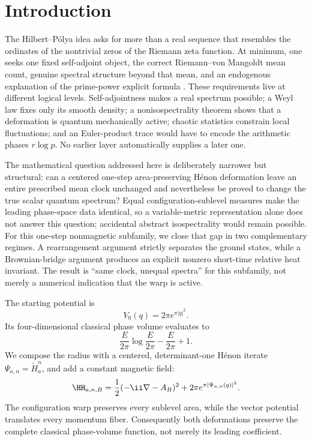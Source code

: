 \section{Introduction}
\label{sec:introduction}

The Hilbert--P\'olya idea asks for more than a real sequence that resembles
the ordinates of the nontrivial zeros of the Riemann zeta function.  At
minimum, one seeks one fixed self-adjoint object, the correct
Riemann--von Mangoldt mean count, genuine spectral structure beyond that
mean, and an endogenous explanation of the prime-power explicit formula
\citep{Riemann1859,TitchmarshHeathBrown1986,BerryKeating1999}.  These
requirements live at different logical levels.  Self-adjointness makes a
real spectrum possible; a Weyl law fixes only its smooth density; a
nonisospectrality theorem shows that a deformation is quantum mechanically
active; chaotic statistics constrain local fluctuations; and an
Euler-product trace would have to encode the arithmetic phases \(r\log p\).
No earlier layer automatically supplies a later one.

The mathematical question addressed here is deliberately narrower but
structural: can a centered one-step area-preserving H\'enon deformation leave
an entire prescribed mean clock unchanged and nevertheless be proved to
change the true scalar quantum spectrum?  Equal configuration-sublevel
measures make the leading phase-space data identical, so a variable-metric
representation alone does not answer this question; accidental abstract
isospectrality would remain possible.  For this one-step nonmagnetic
subfamily, we close that gap in two complementary regimes.  A rearrangement
argument strictly separates the ground states, while a Brownian-bridge
argument produces an explicit nonzero short-time relative heat invariant.
The result is ``same clock, unequal spectra'' for this subfamily, not merely
a numerical indication that the warp is active.

The starting potential is
\[
 V_0(q)=2\pi e^{\pi|q|^2}.
\]
Its four-dimensional classical phase volume evaluates to
\[
 \frac{E}{2\pi}\log\frac{E}{2\pi}-\frac{E}{2\pi}+1.
\]
We compose the radius with a centered, determinant-one H\'enon iterate
\(\Psi_{a,n}=\widetilde H_a^n\), and add a constant magnetic field:
\begin{equation}
 \HH_{a,n,B}
 =\frac12(-\ii\nabla-A_B)^2+
 2\pi e^{\pi|\Psi_{a,n}(q)|^2}.
 \label{eq:intro-operator}
\end{equation}
The configuration warp preserves every sublevel area, while the vector
potential translates every momentum fiber.  Consequently both deformations
preserve the complete classical phase-volume function, not merely its leading
coefficient.

